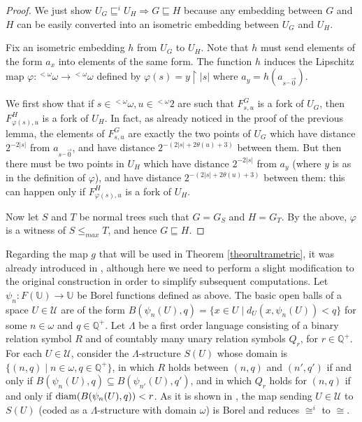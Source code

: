 \documentclass{amsart}
\theoremstyle{definition}
\theoremstyle{remark}
\begin{document}
\begin{proof}
We just show $U_G \sqsubseteq^i U_H {\Rightarrow} G \sqsubseteq H$
because any embedding between  $G$ and $H$ can be easily converted
into an isometric embedding between $U_G$ and $U_H$.

Fix an isometric embedding $h$ from $U_G$ to $U_H$. Note that
 $h$ must send
 elements of the form $a_x$ into elements of
 the same form. The function $h$ induces the Lipschitz map ${\varphi} \colon {}^{< \omega} \omega \to {}^{< \omega} \omega$ defined by ${\varphi}(s) = y \restriction |s|$ where $a_y = h(a_{s {}^\smallfrown \vec{0}})$.

We first show that if $s \in {}^{<\omega} \omega, u \in {}^{<\omega} 2$ are
such that $F^G_{s,u}$ is a fork of $U_G$, then $F^H_{{\varphi}(s),u}$
is a fork of $U_H$.
In fact, as already noticed in the proof of the previous lemma, the elements of
$F^G_{s,u}$ are exactly the two points of $U_G$ which  have
distance $2^{-2 |s|}$ from $a_{s{}^\smallfrown \vec{0}}$, and have distance
$2^{-(2|s|+2\theta(u)+3)}$ between them. But then there must be two
points in $U_H$ which have distance $2^{-2 |s|}$ from
$a_y$ (where $y$ is as in the definition of ${\varphi}$), and have distance $2^{-(2|s|+2\theta(u)+3)}$ between them: this can
happen only if $F^H_{{\varphi}(s),u}$ is a fork of $U_H$.

Now let $S$ and $T$ be normal trees such that $G = G_S$ and $H = G_T$. By the above, ${\varphi}$ is a witness of $S \leq_{max} T$, and hence $G \sqsubseteq H$.
\end{proof}

Regarding the map $g$ that will be used in Theorem
\ref{theorultrametric}, it was already introduced in
\cite{gaokechris}, although here we need to perform a slight
modification to the original construction in order to simplify
subsequent computations. Let $\psi_n \colon F(\mathbb{U}) \to
\mathbb{U}$ be Borel functions defined as above.
The basic open balls of a space $U \in \mathcal{U}$ are
of the form $B(\psi_n(U),q) = \{ x \in U \mid d_U(x, \psi_n(U)) < q
\}$ for some $n \in \omega$ and $q \in
{\mathbb{Q}}^+$. Let $\Lambda $ be a first order language consisting of a binary
relation symbol $R$ and of countably many unary relation symbols
$Q_r$, for $r\in {\mathbb{Q}}^+$. For
each $U \in \mathcal{U}$, consider the $\Lambda $-structure $S(U)$ whose
domain is $\{ (n, q) \mid n\in \omega ,q\in {\mathbb{Q}}^+ \}$, in which $R$
holds between $(n,q)$ and $(n',q')$ if and
only if $B(\psi_n(U),q) \subseteq B(\psi_{n'}(U),q')$, and in
which $Q_r$ holds for $(n,q)$ if and only if ${\rm
  diam}(B(\psi_n(U),q)) <r$. As it is shown in \cite{gaokechris},
the map sending $U \in \mathcal{U}$ to $S(U)$ (coded as a
$\Lambda $-structure with domain $\omega$) is Borel and reduces
$\cong^i$ to $\cong$.
\end{document}
